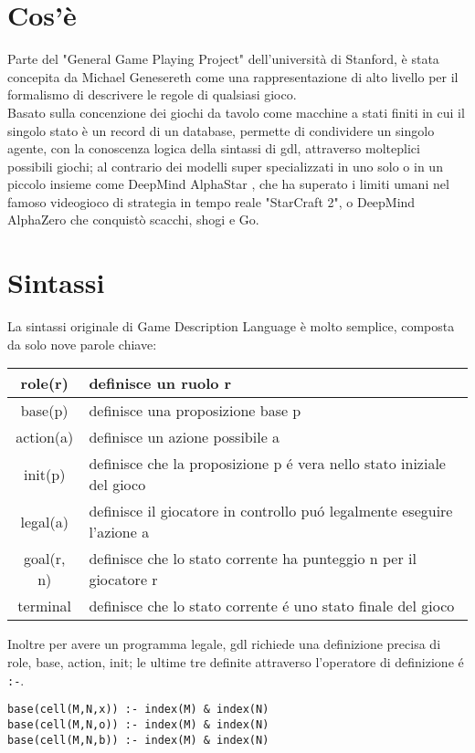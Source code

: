 \section{Cos'è} %
Parte del "General Game Playing Project" dell'università di Stanford,
è stata concepita da Michael Genesereth come una rappresentazione di alto livello per 
il formalismo di descrivere le regole di qualsiasi gioco. \\
Basato sulla concenzione dei giochi da tavolo come macchine a stati finiti in cui il singolo stato
è un record di un database,
permette di condividere un singolo agente, con la conoscenza logica della sintassi di gdl,
attraverso molteplici possibili giochi; al contrario dei modelli super specializzati in uno solo o 
in un piccolo insieme come DeepMind AlphaStar \cite{AlphaStar},
che ha superato i limiti umani nel famoso videogioco di strategia in tempo reale "StarCraft 2",
o DeepMind AlphaZero \cite{AlphaZero} che conquistò scacchi, shogi e Go. \\

\section{Sintassi}
La sintassi originale di Game Description Language è molto semplice, composta da solo nove parole chiave:
\begin{center}
\begin{tabular}{|c|p{5cm}|}
    \hline
    role(r) & definisce un ruolo r \\
    \hline
    base(p) & definisce una proposizione base p \\
    \hline
    action(a) & definisce un azione possibile a \\
    \hline
    init(p) & definisce che la proposizione p é vera nello stato iniziale del gioco \\ 
    \hline
    legal(a) & definisce il giocatore in controllo puó legalmente eseguire l'azione a \\
    \hline
    goal(r, n) & definisce che lo stato corrente ha punteggio n per il giocatore r \\
    \hline
    terminal & definisce che lo stato corrente é uno stato finale del gioco \\ 
    \hline
\end{tabular}
\end{center}
Inoltre per avere un programma legale, gdl richiede una definizione precisa di role, base, action, init;
le ultime tre definite attraverso l'operatore di definizione é \lstinline|:-|. \\
\begin{lstlisting}[caption=Esempio: definizione cella di tris]
base(cell(M,N,x)) :- index(M) & index(N)
base(cell(M,N,o)) :- index(M) & index(N)
base(cell(M,N,b)) :- index(M) & index(N)
\end{lstlisting}

